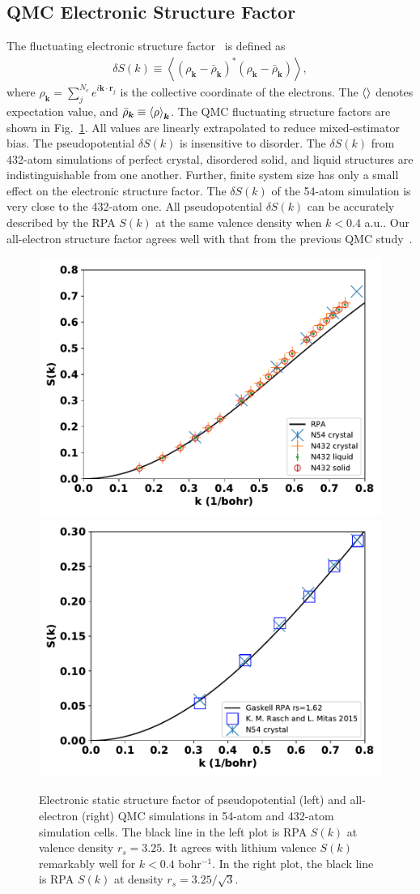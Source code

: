 \documentclass[aps,prl,superscriptaddress]{revtex4-1}
\newcommand{\bs}{\boldsymbol}
\begin{document}
\subsection{QMC Electronic Structure Factor}

The fluctuating electronic structure factor~\cite{Holzmann2016} is defined as
\begin{align}
\delta S(k) \equiv \left\langle
(\rho_{\bs{k}}-\bar{\rho}_{\bs{k}})^* (\rho_{\bs{k}}-\bar{\rho}_{\bs{k}})
\right\rangle,
\end{align}
where $\rho_{\bs{k}} = \sum\limits_j^{N_e} e^{i\bs{k}\cdot\bs{r}_j}$ is the collective coordinate of the electrons. The $\braket{}$ denotes expectation value, and $\bar{\rho}_{\bs{k}}\equiv\braket{\rho}_{\bs{k}}$. The QMC fluctuating structure factors are shown in Fig.~\ref{fig:qmc-dsk}. All values are linearly extrapolated to reduce mixed-estimator bias. The pseudopotential $\delta S(k)$ is insensitive to disorder. The $\delta S(k)$ from 432-atom simulations of perfect crystal, disordered solid, and liquid structures are indistinguishable from one another. Further, finite system size has only a small effect on the electronic structure factor. The $\delta S(k)$ of the 54-atom simulation is very close to the 432-atom one. All pseudopotential $\delta S(k)$ can be accurately described by the RPA $S(k)$ at the same valence density when $k<0.4$ a.u.. Our all-electron structure factor agrees well with that from the previous QMC study~\cite{Rasch2015}.

\begin{figure}[h]
\includegraphics[width=0.48\linewidth]{li40bg_dsk-bfd}
\includegraphics[width=0.48\linewidth]{li40bg_dsk-fc}
\caption{Electronic static structure factor of pseudopotential (left) and all-electron (right) QMC simulations in 54-atom and 432-atom simulation cells. The black line in the left plot is RPA $S(k)$ at valence density $r_s=3.25$. It agrees with lithium valence $S(k)$ remarkably well for $k<0.4$ bohr$^{-1}$. In the right plot, the black line is RPA $S(k)$ at density $r_s=3.25/\sqrt{3}$. \label{fig:qmc-dsk}}
\end{figure}
\end{document}
